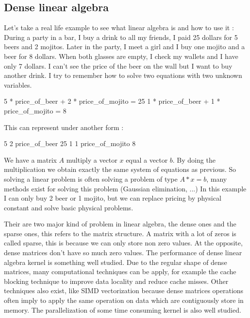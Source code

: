 \subsection{Dense linear algebra}

Let's take a real life example to see what linear algebra is and how to use it :\\
%
During a party in a bar, I buy a drink to all my friends, I paid 25 dollars for 5 beers and 2 mojitos.
%
Later in the party, I meet a girl and I buy one mojito and a beer for 8 dollars.
%
When both glasses are empty, I check my wallets and I have only 7 dollars.
%
I can't see the price of the beer on the wall but I want to buy another drink.
%
I try to remember how to solve two equations with two unknown variables.

5 * price\_of\_beer + 2 * price\_of\_mojito = 25
1 * price\_of\_beer + 1 * price\_of\_mojito = 8

This can represent under another form :

5 2   price\_of\_beer   25
1 1   price\_of\_mojito 8

We have a matrix $A$ multiply a vector $x$ equal a vector $b$.
%
By doing the multiplication we obtain exactly the same system of equations as previous.
%
So solving a linear problem is often solving a problem of type $A*x=b$, many methods exist for solving this problem (Gaussian elimination, ...)
%
In this example I can only buy 2 beer or 1 mojito, but we can replace pricing by physical constant and solve basic physical problems.


Their are two major kind of problem in linear algebra, the dense ones and the sparse ones, this refers to the matrix structure.
%
A matrix with a lot of zeros is called sparse, this is because we can only store non zero values.
%
At the opposite, dense matrices don't have so much zero values.
%
The performance of dense linear algebra kernel is something well studied.
%
Due to the regular shape of dense matrices, many computational techniques can be apply, for example the cache blocking technique to improve data locality and reduce cache misses.
%
Other techniques also exist, like SIMD vectorization because dense matrices operations often imply to apply the same operation on data which are contiguously store in memory.
%
The parallelization of some time consuming kernel is also well studied.
